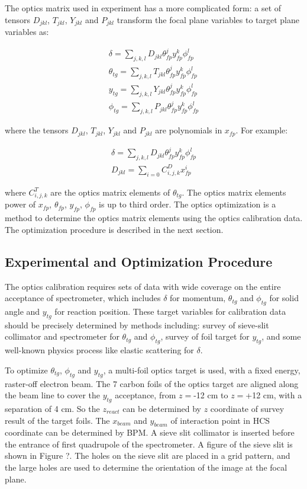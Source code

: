 The optics matrix used in experiment has a more complicated form: a set of tensors
$D_{jkl}$, $T_{jkl}$, $Y_{jkl}$ and $P_{jkl}$ transform the focal plane variables to
target plane variables as:

\begin{align}
\delta = \sum\limits_{j,k,l} D_{jkl} \theta_{fp}^{j} y_{fp}^{k} \phi_{fp}^{l} \\
\theta_{tg} = \sum\limits_{j,k,l} T_{jkl} \theta_{fp}^{j} y_{fp}^{k} \phi_{fp}^{l} \\
y_{tg} = \sum\limits_{j,k,l} Y_{jkl} \theta_{fp}^{j} y_{fp}^{k} \phi_{fp}^{l} \\
\phi_{tg} = \sum\limits_{j,k,l} P_{jkl} \theta_{fp}^{j} y_{fp}^{k} \phi_{fp}^{l}
\end{align}

where the tensors  $D_{jkl}$, $T_{jkl}$, $Y_{jkl}$ and $P_{jkl}$ are polynomials in $x_{fp}$.
For example:

\begin{align}
\delta = \sum\limits_{j,k,l} D_{jkl} \theta_{fp}^{j} y_{fp}^{k} \phi_{fp}^{l} \\
D_{jkl} = \sum\limits_{i=0} C_{i,j,k}^D x_{fp}^i 
\end{align}

where $C_{i,j,k}^T$ are the optics matrix elements of $\theta_{tg}$.
The optics matrix elements power of  $x_{fp}$, $\theta_{fp}$, $y_{fp}$, $\phi_{fp}$ is 
up to third order. The optics optimization is a method to determine the optics matrix
elements using the optics calibration data. The optimization procedure is described in 
the next section.

\subsection{Experimental and Optimization Procedure}
The optics calibration requires sets of data with wide coverage on the entire acceptance
of spectrometer, which includes $\delta$ for momentum, $\theta_{tg}$ and $\phi_{tg}$ for solid
angle and $y_{tg}$ for reaction position. 
These target variables for calibration data should be precisely determined by methods including:
survey of sieve-slit collimator and spectrometer for $\theta_{tg}$ and $\phi_{tg}$, survey of foil target 
for $y_{tg}$, and some well-known physics process like elastic scattering for $\delta$.

To optimize $\theta_{tg}$, $\phi_{tg}$ and $y_{tg}$, a multi-foil optics target is used,
with a fixed energy, raster-off electron beam. The 7 carbon foils of the optics target
are aligned along the beam line to cover the $y_{tg}$ acceptance, from $z=$-12 cm to $z=$+12 cm,
with a separation of 4 cm. So the $z_{react}$ can be determined by $z$ coordinate of survey result of the 
target foils. The $x_{beam}$ and $y_{beam}$ of interaction point in HCS coordinate can
be determined by BPM. A sieve slit collimator is inserted before the entrance of first quadrupole
of the spectrometer. A figure of the sieve slit is shown in Figure ?.
The holes on the sieve slit are placed in a grid pattern, and the large holes are used to determine
the orientation of the image at the focal plane. 

